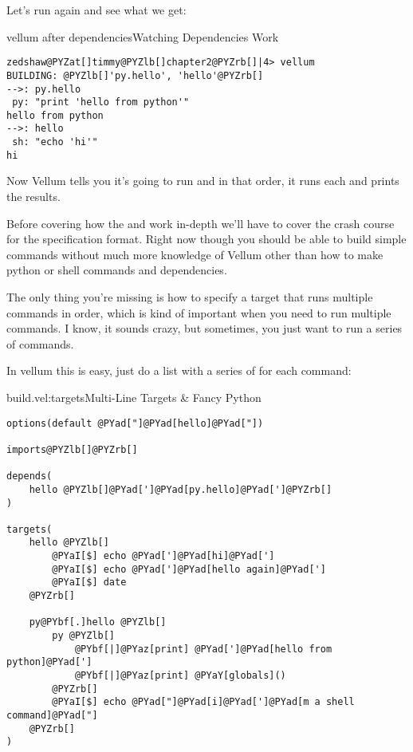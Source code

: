 Let's run  again and see what we get:

\begin{code}{vellum after dependencies}{Watching Dependencies Work}
\begin{Verbatim}[commandchars=@\[\]]
zedshaw@PYZat[]timmy@PYZlb[]chapter2@PYZrb[]|4> vellum
BUILDING: @PYZlb[]'py.hello', 'hello'@PYZrb[]
-->: py.hello
 py: "print 'hello from python'"
hello from python
-->: hello
 sh: "echo 'hi'"
hi
\end{Verbatim}

\end{code}

Now Vellum tells you it's going to run  and  in
that order, it runs each and prints the results.

Before covering how the  and  work in-depth we'll
have to cover the crash course for the specification format.  Right now though
you should be able to build simple commands without much more knowledge of
Vellum other than how to make python or shell commands and dependencies.

The only thing you're missing is how to specify a target that runs multiple
commands in order, which is kind of important when you need to run multiple
commands.  I know, it sounds crazy, but sometimes, you just want to run a series
of commands.

In vellum this is easy, just do a list with a series of  for
each command:

\begin{code}{build.vel:targets}{Multi-Line Targets \& Fancy Python}
\begin{Verbatim}[commandchars=@\[\]]
options(default @PYad["]@PYad[hello]@PYad["])

imports@PYZlb[]@PYZrb[] 

depends(
    hello @PYZlb[]@PYad[']@PYad[py.hello]@PYad[']@PYZrb[]
)

targets(
    hello @PYZlb[]
        @PYaI[$] echo @PYad[']@PYad[hi]@PYad[']
        @PYaI[$] echo @PYad[']@PYad[hello again]@PYad[']
        @PYaI[$] date
    @PYZrb[]

    py@PYbf[.]hello @PYZlb[]
        py @PYZlb[] 
            @PYbf[|]@PYaz[print] @PYad[']@PYad[hello from python]@PYad[']
            @PYbf[|]@PYaz[print] @PYaY[globals]()
        @PYZrb[]
        @PYaI[$] echo @PYad["]@PYad[i]@PYad[']@PYad[m a shell command]@PYad["]
    @PYZrb[]
)
\end{Verbatim}

\end{code}

